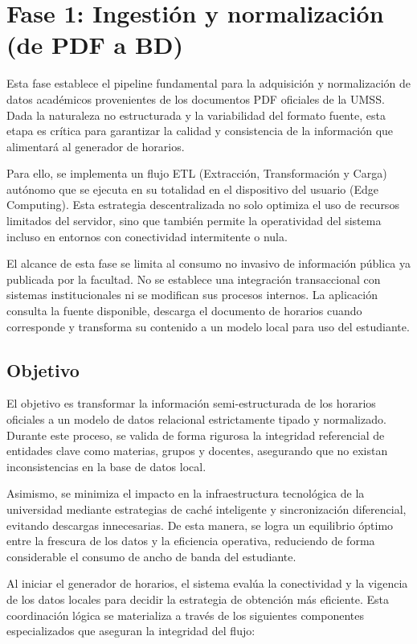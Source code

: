 \section{Fase 1: Ingestión y normalización (de PDF a BD)}

Esta fase establece el pipeline fundamental para la adquisición y normalización de datos académicos provenientes de los documentos PDF oficiales de la UMSS. Dada la naturaleza no estructurada y la variabilidad del formato fuente, esta etapa es crítica para garantizar la calidad y consistencia de la información que alimentará al generador de horarios.

Para ello, se implementa un flujo ETL (Extracción, Transformación y Carga) autónomo que se ejecuta en su totalidad en el dispositivo del usuario (Edge Computing). Esta estrategia descentralizada no solo optimiza el uso de recursos limitados del servidor, sino que también permite la operatividad del sistema incluso en entornos con conectividad intermitente o nula.

El alcance de esta fase se limita al consumo no invasivo de información pública ya publicada por la facultad. No se establece una integración transaccional con sistemas institucionales ni se modifican sus procesos internos. La aplicación consulta la fuente disponible, descarga el documento de horarios cuando corresponde y transforma su contenido a un modelo local para uso del estudiante.

\subsection{Objetivo}
El objetivo es transformar la información semi-estructurada de los horarios oficiales a un modelo de datos relacional estrictamente tipado y normalizado. Durante este proceso, se valida de forma rigurosa la integridad referencial de entidades clave como materias, grupos y docentes, asegurando que no existan inconsistencias en la base de datos local.

Asimismo, se minimiza el impacto en la infraestructura tecnológica de la universidad mediante estrategias de caché inteligente y sincronización diferencial, evitando descargas innecesarias. De esta manera, se logra un equilibrio óptimo entre la frescura de los datos y la eficiencia operativa, reduciendo de forma considerable el consumo de ancho de banda del estudiante.

Al iniciar el generador de horarios, el sistema evalúa la conectividad y la vigencia de los datos locales para decidir la estrategia de obtención más eficiente. Esta coordinación lógica se materializa a través de los siguientes componentes especializados que aseguran la integridad del flujo:

